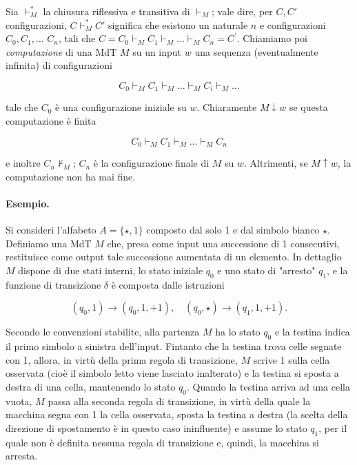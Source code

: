 Sia \(\vdash^*_M\) la chiusura riflessiva e transitiva di \(\vdash_M\); vale dire,
per \(C, C'\) configurazioni, \(C \vdash^*_M C'\) significa che esistono un
naturale $n$ e configurazioni $C_0, C_1, \ldots$ $C_n$, tali che
$C = C_0 \vdash_M C_1 \vdash_M \ldots \vdash_M C_n = C^{\prime}$.
Chiamiamo poi \textit{computazione} di una MdT $M$ su un input $w$ una sequenza
(eventualmente infinita) di configurazioni

\[
    C_0 \vdash_M C_1 \vdash_M \ldots \vdash_M C_i \vdash_M \ldots
\]

tale che $C_0$ è una configurazione iniziale su $w$. Chiaramente
$M \downarrow w$ se questa computazione è finita

\[
    C_0 \vdash_M C_1 \vdash_M \ldots \vdash_M C_n
\]

e inoltre $C_n \nvdash_M$; $C_n$ è la configurazione finale di $M$ su $w$.
Altrimenti, se $M \uparrow w$, la computazione non ha mai fine.

\paragraph{Esempio.}
Si consideri l'alfabeto $A = \{\star, 1\}$ composto dal solo 1 e dal simbolo
bianco $\star$. Definiamo una MdT $M$ che, presa come input una successione di
1 consecutivi, restituisce come output tale successione aumentata di un elemento.
In dettaglio $M$ dispone di due stati interni, lo stato iniziale $q_0$ e uno stato
di "arresto" $q_1$, e la funzione di transizione $\delta$ è composta dalle
istruzioni

\[
    \left(q_0, 1\right) \rightarrow\left(q_0, 1,+1\right), \quad\left(q_0, \star\right) \rightarrow\left(q_1, 1,+1\right) .
\]

Secondo le convenzioni stabilite, alla partenza $M$ ha lo stato $q_0$ e la testina
indica il primo simbolo a sinistra dell'input.
Fintanto che la testina trova celle segnate con 1, allora, in virtù della prima
regola di transizione, $M$ scrive 1 sulla cella osservata
(cioè il simbolo letto viene lasciato inalterato) e la testina si sposta a
destra di una cella, mantenendo lo stato $q_0$.
Quando la testina arriva ad una cella vuota, $M$ passa alla seconda regola di
transizione, in virtù della quale la macchina segna con 1 la cella osservata,
sposta la testina a destra (la scelta della direzione di spostamento è in questo
caso ininfluente) e assume lo stato $q_1$, per il quale non è definita nessuna
regola di transizione e, quindi, la macchina si arresta.

